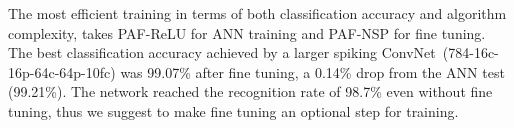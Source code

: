 	
	
	
	
	The most efficient training in terms of both classification accuracy and algorithm complexity, takes PAF-ReLU for ANN training and PAF-NSP for fine tuning.
	The best classification accuracy achieved by a larger spiking ConvNet~(784-16c-16p-64c-64p-10fc) was 99.07\% after fine tuning, a 0.14\% drop from the ANN test (99.21\%).
	The network reached the recognition rate of 98.7\% even without fine tuning, thus we suggest to make fine tuning an optional step for training.
	
